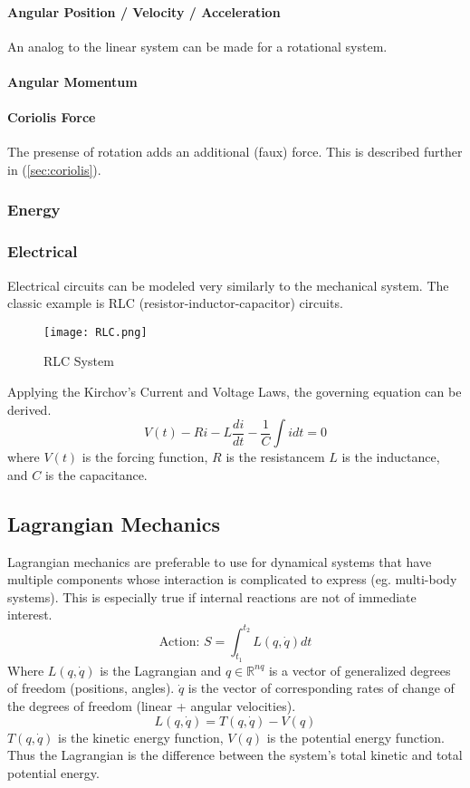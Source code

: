 \documentclass[../notes.tex]{subfiles}
\begin{document}
\paragraph{Angular Position / Velocity / Acceleration}
An analog to the linear system can be made for a rotational system.
\paragraph{Angular Momentum}
\paragraph{Coriolis Force}
The presense of rotation adds an additional (faux) force. This is described further in (\underline{\ref{sec:coriolis}}).
\subsubsection{Energy}
\subsubsection{Electrical}

Electrical circuits can be modeled very similarly to the mechanical system. The classic example is RLC (resistor-inductor-capacitor) circuits.

\begin{figure}[H]
    \centering
    \texttt{[image: RLC.png]}
    \caption{RLC System}
    \label{fig:RLC}
\end{figure}

Applying the Kirchov's Current and Voltage Laws, the governing equation can be derived.
\begin{equation}
    V(t) - Ri - L\frac{di}{dt} - \frac{1}{C}\int idt = 0
\end{equation}
where $V(t)$ is the forcing function, $R$ is the resistancem $L$ is the inductance, and $C$ is the capacitance.

\subsection{Lagrangian Mechanics}
Lagrangian mechanics are preferable to use for dynamical systems that have multiple components whose interaction is complicated to express (eg. multi-body systems). This is especially true if internal reactions are not of immediate interest.
\begin{equation} \label{eq:lagrangian}
    \text{Action: } S = \int_{t_1}^{t_2} L(q, \dot{q})dt
\end{equation}
Where $L(q, \dot{q})$ is the Lagrangian and $q\in \mathbb{R}^{nq}$ is a vector of generalized degrees of freedom (positions, angles). $\dot{q}$ is the vector of corresponding rates of change of the degrees of freedom (linear + angular velocities).
\begin{equation}
    L(q, \dot{q}) = T(q, \dot{q}) - V(q)
\end{equation}
$T(q, \dot{q})$ is the kinetic energy function, $V(q)$ is the potential energy function. Thus the Lagrangian is the difference between the system's total kinetic and total potential energy.
\end{document}
